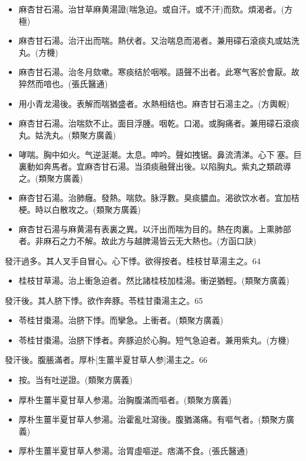 \documentclass[oneside,b4paper]{ctexbook}
\begin{document}
\begin{flushleft}
\begin{itemize}
\item 麻杏甘石湯。治甘草麻黄湯證(喘急迫。或自汗。或不汗)而欬。煩渴者。(方極)
\item 麻杏甘石湯。治汗出而喘。熱伏者。又治喘息而渴者。兼用礞石滾痰丸或姑洗丸。(方機)
\item 麻杏甘石湯。治冬月欬嗽。寒痰结於咽喉。語聲不出者。此寒气客於會厭。故猝然而喑也。(張氏醫通)
\item 用小青龙湯後。表解而喘猶盛者。水熱相结也。麻杏甘石湯主之。(方輿輗)
\item 麻杏甘石湯。治喘欬不止。面目浮腫。咽乾。口渴。或胸痛者。兼用礞石滾痰丸。姑洗丸。(類聚方廣義)
\item 哮喘。胸中如火。气逆涎潮。太息。呻吟。聲如拽锯。鼻流清涕。心下{𩊅}塞。巨裏動如奔馬者。宜麻杏甘石湯。当須痰融聲出後。以陷胸丸。紫丸之類疏導之。(類聚方廣義)
\item 麻杏甘石湯。治肺癰。發熱。喘欬。脉浮數。臭痰膿血。渴欲饮水者。宜加桔梗。時以白散攻之。(類聚方廣義)
\item 麻杏甘石湯与麻黄湯有表裏之異。以汗出而喘为目的。熱在肉裏。上熏肺部者。非麻石之力不解。故此方与越脾湯皆云无大熱也。(方函口訣)
\end{itemize}

發汗過多。其人叉手自冒心。心下悸。欲得按者。桂枝甘草湯主之。64

\begin{itemize}
\item 桂枝甘草湯。治上衝急迫者。然比諸桂枝加桂湯。衝逆猶輕。(類聚方廣義)
\end{itemize}

發汗後。其人脐下悸。欲作奔豚。苓桂甘棗湯主之。65

\begin{itemize}
\item 苓桂甘棗湯。治脐下悸。而攣急。上衝者。(類聚方廣義)
\item 苓桂甘棗湯。治脐下悸者。奔豚迫於心胸。短气急迫者。兼用紫丸。(方機)
\end{itemize}

發汗後。腹脹滿者。厚朴[生薑半夏甘草人参]湯主之。66

\begin{itemize}
\item 按。当有吐逆證。(類聚方廣義)
\item 厚朴生薑半夏甘草人参湯。治胸腹滿而嘔者。(類聚方廣義)
\item 厚朴生薑半夏甘草人参湯。治霍亂吐瀉後。腹猶滿痛。有嘔气者。(類聚方廣義)
\item 厚朴生薑半夏甘草人参湯。治胃虛嘔逆。痞滿不食。(張氏醫通)
\end{itemize}


\end{flushleft}
\end{document}
